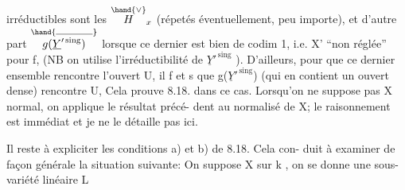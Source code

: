 irréductibles sont les  $\overset{\hand{\vee}}{H}_x$  (répetés éventuellement, peu importe), et
d'autre part $\overset{\hand{\rule{3.3em}{0.35pt}}}{g(\underline{Y}'^{\,\mathrm{sing}})}$  lorsque  ce dernier  est bien de codim 1, i.e.
X' ``non réglée'' pour f, (NB on utilise l'irréductibilité de  $\underline{Y}'^{\,\mathrm{sing}}$ ).
D'ailleurs, pour que ce dernier ensemble rencontre  l'ouvert U,
il f et s  que  g($\underline{Y}'^{\,\mathrm{sing}}$)  (qui en contient un ouvert dense) rencontre
U,  Cela prouve 8.18. dans ce
cas.  Lorsqu'on ne suppose pas X normal, on applique le résultat précé-%
dent au normalisé de X; le raisonnement est immédiat et je ne le détaille
pas ici.  

Il reste à expliciter  les conditions a) et b) de 8.18. Cela con-%
duit à examiner de façon générale la situation suivante:  On suppose
X  sur k , on se donne une sous-variété linéaire  L 

